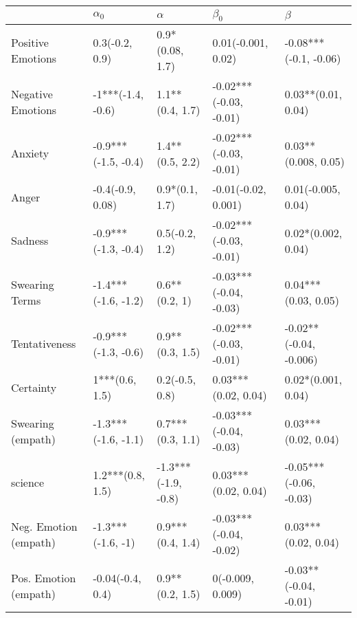 \begin{tabular}{lllll}
\toprule
{} &           $\alpha_0$ &             $\alpha$ &               $\beta_0$ &                 $\beta$ \\
\midrule
Positive Emotions     &       0.3(-0.2, 0.9) &      0.9*(0.08, 1.7) &      0.01(-0.001, 0.02) &   -0.08***(-0.1, -0.06) \\
Negative Emotions     &    -1***(-1.4, -0.6) &      1.1**(0.4, 1.7) &  -0.02***(-0.03, -0.01) &      0.03**(0.01, 0.04) \\
Anxiety               &  -0.9***(-1.5, -0.4) &      1.4**(0.5, 2.2) &  -0.02***(-0.03, -0.01) &     0.03**(0.008, 0.05) \\
Anger                 &     -0.4(-0.9, 0.08) &       0.9*(0.1, 1.7) &     -0.01(-0.02, 0.001) &      0.01(-0.005, 0.04) \\
Sadness               &  -0.9***(-1.3, -0.4) &       0.5(-0.2, 1.2) &  -0.02***(-0.03, -0.01) &      0.02*(0.002, 0.04) \\
Swearing Terms        &  -1.4***(-1.6, -1.2) &        0.6**(0.2, 1) &  -0.03***(-0.04, -0.03) &     0.04***(0.03, 0.05) \\
Tentativeness         &  -0.9***(-1.3, -0.6) &      0.9**(0.3, 1.5) &  -0.02***(-0.03, -0.01) &  -0.02**(-0.04, -0.006) \\
Certainty             &       1***(0.6, 1.5) &       0.2(-0.5, 0.8) &     0.03***(0.02, 0.04) &      0.02*(0.001, 0.04) \\
Swearing (empath)     &  -1.3***(-1.6, -1.1) &     0.7***(0.3, 1.1) &  -0.03***(-0.04, -0.03) &     0.03***(0.02, 0.04) \\
science               &     1.2***(0.8, 1.5) &  -1.3***(-1.9, -0.8) &     0.03***(0.02, 0.04) &  -0.05***(-0.06, -0.03) \\
Neg. Emotion (empath) &    -1.3***(-1.6, -1) &     0.9***(0.4, 1.4) &  -0.03***(-0.04, -0.02) &     0.03***(0.02, 0.04) \\
Pos. Emotion (empath) &     -0.04(-0.4, 0.4) &      0.9**(0.2, 1.5) &        0(-0.009, 0.009) &   -0.03**(-0.04, -0.01) \\
\bottomrule
\end{tabular}
